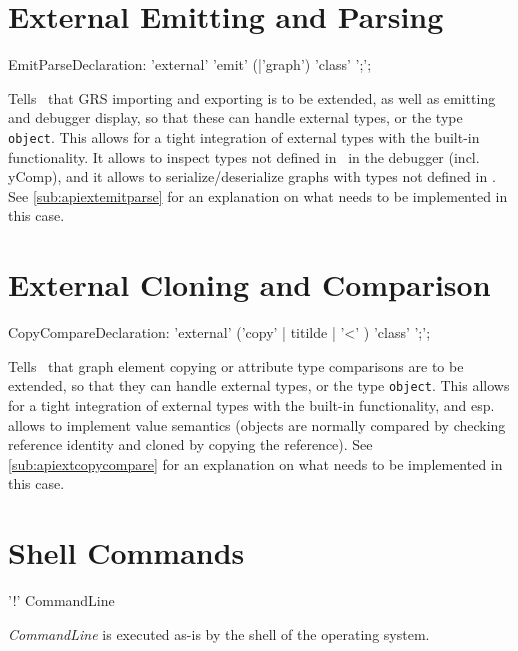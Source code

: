 \section{External Emitting and Parsing}\label{sub:extemitparse}
\begin{rail}
  EmitParseDeclaration: 'external' 'emit' (|'graph') 'class' ';';
\end{rail}
Tells \GrG~that GRS importing and exporting is to be extended, as well as emitting and debugger display, so that these can handle external types, or the type \texttt{object}.
This allows for a tight integration of external types with the built-in functionality.
It allows to inspect types not defined in \GrG~in the debugger (incl. yComp),
and it allows to serialize/deserialize graphs with types not defined in \GrG.
See \ref{sub:apiextemitparse} for an explanation on what needs to be implemented in this case.

\section{External Cloning and Comparison}\label{sub:extcopycompare}
\begin{rail}
  CopyCompareDeclaration: 'external' ('copy' | titilde | '<' ) 'class' ';';
\end{rail}
Tells \GrG~that graph element copying or attribute type comparisons are to be extended, so that they can handle external types, or the type \texttt{object}.
This allows for a tight integration of external types with the built-in functionality, 
and esp. allows to implement value semantics (objects are normally compared by checking reference identity and cloned by copying the reference).
See \ref{sub:apiextcopycompare} for an explanation on what needs to be implemented in this case.

\section{Shell Commands}

\begin{rail}
  '!' CommandLine
\end{rail}
\emph{CommandLine} is executed as-is by the shell of the operating system.

